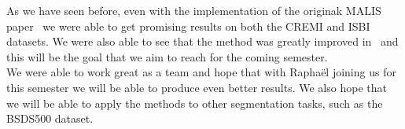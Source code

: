 
As we have seen before, even with the implementation of the originak MALIS
paper~\cite{turaga_maximin_2009} we were able to get promising results on both
the CREMI and ISBI datasets.  We were also able to see that the method was greatly
improved in~\cite{funke_large_2019} and this will be the goal that we aim to
reach for the coming semester.\\
We were able to work great as a team and hope that with Raphaël joining us for
this semester we will be able to produce even better results. We also hope that
we will be able to apply the methods to other segmentation tasks, such as the BSDS500 dataset.

